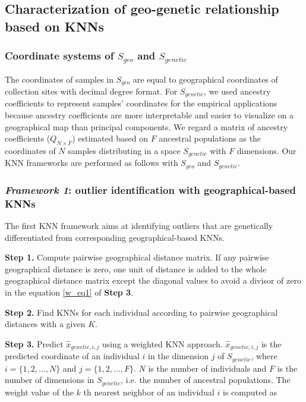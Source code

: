 \documentclass[11pt]{article}
\begin{document}
\subsection*{Characterization of geo-genetic relationship based on KNNs}

\subsubsection*{Coordinate systems of $S_{geo}$ and $S_{genetic}$}

The coordinates of samples in $S_{geo}$ are equal to geographical coordinates of collection sites with decimal degree format.
For $S_{genetic}$, we used ancestry coefficients \citep{pritchard2000inference} to represent samples' coordinates for the empirical applications because ancestry coefficients are more interpretable and easier to visualize on a geographical map than principal components.
We regard a matrix of ancestry coefficients ($Q_{N\times F}$) estimated based on $F$ ancestral populations as the coordinates of $N$ samples distributing in a space $S_{genetic}$ with $F$ dimensions.
Our KNN frameworks are performed as follows with $S_{geo}$ and $S_{genetic}$.

\subsubsection*{\textit{Framework 1}: outlier identification with geographical-based KNNs}

The first KNN framework aims at identifying outliers that are genetically differentiated from corresponding geographical-based KNNs.

\textbf{Step 1.} Compute pairwise geographical distance matrix. 
If any pairwise geographical distance is zero, one unit of distance is added to the whole geographical distance matrix except the diagonal values to avoid a divisor of zero in the equation \ref{w_eq1} of \textbf{Step 3}.

\textbf{Step 2.} Find KNNs for each individual according to pairwise geographical distances with a given $K$.

\textbf{Step 3.} Predict $\hat{x}_{genetic,i,j}$ using a weighted KNN approach.
$\hat{x}_{genetic,i,j}$ is the predicted coordinate of an individual $i$ in the dimension $j$ of $S_{genetic}$, where $i = \{1,2,...,N\}$ and $j = \{1,2,...,F\}$. $N$ is the number of individuals and $F$ is the number of dimensions in $S_{genetic}$, i.e. the number of ancestral populations. 
The weight value of the $k$ th nearest neighbor of an individual $i$ is computed as
\end{document}
